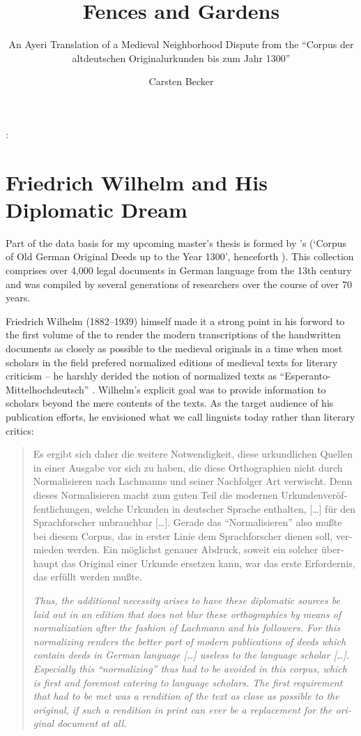 \documentclass[12pt,paper=a4]{scrartcl}
\author{Carsten Becker}
\title{Fences and Gardens}
\subtitle{An Ayeri Translation of a Medieval Neighborhood Dispute from the \enquote{Corpus der altdeutschen Originalurkunden bis zum Jahr 1300}}
\newenvironment{mytitle}{
    \hfill
    \begin{minipage}{0.667\textwidth}
	\vspace{\baselineskip}
	\begin{center}
	    \Large
	    \sffamily\bfseries
	    \makeatletter
}{
	    \makeatother
	\end{center}
	\vspace{1em}
    \end{minipage}
    \hfill
}
\begin{document}

\begin{mytitle}
    \@title: \@subtitle
\end{mytitle}

\section{Friedrich Wilhelm and His Diplomatic Dream}
Part of the data basis for my upcoming master's thesis is formed by \citeauthor{CAO}'s  (\enquote*{Corpus of Old German Original Deeds up to the Year 1300}, henceforth ). This collection comprises over 4,000 legal documents in German language from the 13th century and was compiled by several generations of researchers over the course of over 70 years.

Friedrich Wilhelm (1882–1939) himself made it a strong point in his forword to the first volume of the  to render the modern transcriptions of the handwritten documents as closely as possible to the medieval originals in a time when most scholars in the field prefered normalized editions of medieval texts for literary criticism – he harshly derided the notion of normalized texts as \enquote{Esperanto-Mittelhochdeutsch} \autocite[see][VIII--IX]{CAO1}. Wilhelm's explicit goal was to provide information to scholars beyond the mere contents of the texts. As the target audience of his publication efforts, he envisioned what we call linguists today rather than literary critics:

\foreignblockquote{german}{\begin{multicols}{2}Es ergibt sich daher die weitere Notwendigkeit, diese urkundlichen Quellen in einer Ausgabe vor sich zu haben, die diese Orthographien nicht durch Normalisieren nach Lachmanns und seiner Nachfolger Art verwischt. Denn dieses Normalisieren macht zum guten Teil die modernen Urkundenveröffentlichungen, welche Urkunden in deutscher Sprache enthalten, […] für den Sprachforscher unbrauchbar […]. Gerade das \enquote{Normalisieren} also mußte bei diesem Corpus, das in erster Linie dem Sprachforscher dienen soll, vermieden werden. Ein möglichst genauer Abdruck, soweit ein solcher überhaupt das Original einer Urkunde ersetzen kann, war das erste Erfordernis, das erfüllt werden mußte. \autocite[LX]{CAO1}

\columnbreak

{\itshape Thus, the additional necessity arises to have these diplomatic sources be laid out in an edition that does not blur these orthographies by means of normalization after the fashion of Lachmann and his followers. For this normalizing renders the better part of modern publications of deeds which contain deeds in German language […] useless to the language scholar […]. Especially this \enquote{normalizing} thus had to be avoided in this corpus, which is first and foremost catering to language scholars. The first requirement that had to be met was a rendition of the text as close as possible to the original, if such a rendition in print can ever be a replacement for the original document at all.}\end{multicols}}
\end{document}
